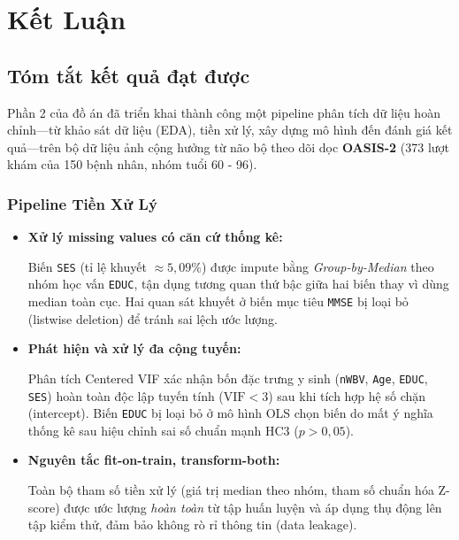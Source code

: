 \chapter{Kết Luận}

\newpage

\section{Tóm tắt kết quả đạt được}

Phần 2 của đồ án đã triển khai thành công một pipeline phân tích dữ liệu hoàn chỉnh—từ
khảo sát dữ liệu (EDA), tiền xử lý, xây dựng mô hình đến đánh giá kết quả—trên bộ
dữ liệu ảnh cộng hưởng từ não bộ theo dõi dọc \textbf{OASIS-2} (373 lượt khám của
150 bệnh nhân, nhóm tuổi 60 - 96).
 
\subsection{ Pipeline Tiền Xử Lý}
 
\begin{itemize}
  \item \textbf{Xử lý missing values có căn cứ thống kê:}
  
   Biến \texttt{SES}
        (tỉ lệ khuyết \(\approx 5{,}09\%\)) được impute bằng
        \emph{Group-by-Median} theo nhóm học vấn \texttt{EDUC}, tận dụng tương
        quan thứ bậc giữa hai biến thay vì dùng median toàn cục. Hai quan sát
        khuyết ở biến mục tiêu \texttt{MMSE} bị loại bỏ (listwise deletion) để
        tránh sai lệch ước lượng.
 
  \item \textbf{Phát hiện và xử lý đa cộng tuyến:} 
  
  Phân tích Centered VIF xác
        nhận bốn đặc trưng y sinh (\texttt{nWBV}, \texttt{Age}, \texttt{EDUC},
        \texttt{SES}) hoàn toàn độc lập tuyến tính (\(\text{VIF} < 3\)) sau khi
        tích hợp hệ số chặn (intercept). Biến \texttt{EDUC} bị loại bỏ ở mô
        hình OLS chọn biến do mất ý nghĩa thống kê sau hiệu chỉnh sai số chuẩn
        mạnh HC3 (\(p > 0{,}05\)).
 
  \item \textbf{Nguyên tắc fit-on-train, transform-both:}
  
   Toàn bộ tham số tiền
        xử lý (giá trị median theo nhóm, tham số chuẩn hóa Z-score) được ước
        lượng \emph{hoàn toàn} từ tập huấn luyện và áp dụng thụ động lên tập
        kiểm thử, đảm bảo không rò rỉ thông tin (data leakage).
\end{itemize}
 
